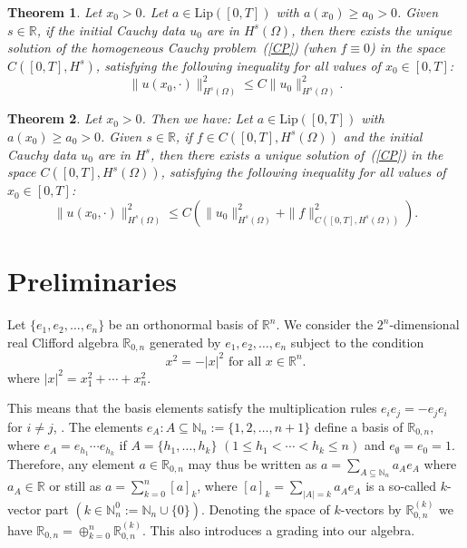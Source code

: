 \documentclass[12pt]{amsart}
\newtheorem{theorem}{Theorem}[section]
\theoremstyle{definition}
\newcommand{\R}{\mathbb{R}}
\newcommand{\N}{\mathbb{N}}
\newcommand{\inci}{\subseteq}
\begin{document}
\begin{theorem}
\label{th1.1}
Let \(x_0 > 0\). Let \(a \in \mathrm{Lip}([0, T])\) with \(a(x_0) \geq a_0 > 0\). Given \(s \in \mathbb{R}\), if the initial Cauchy data \(u_0\) are in \(H^{s}(\Omega)\), then there exists the unique solution of the homogeneous Cauchy problem~(\ref{CP}) (when \(f \equiv 0\)) in the space \(C([0, T], H^{s})\), satisfying the following inequality for all values of \(x_0 \in [0, T]\):
    \begin{equation*}
    \label{eq:1.5}
          \| u(x_0, \cdot) \|_{H^s(\Omega)}^2  \leq C \| u_0 \|_{H^s(\Omega)}^2 .
    \end{equation*}
\end{theorem}

\begin{theorem}
\label{th1.2}
Let \(x_0 > 0\). Then we have:
Let \(a \in \mathrm{Lip}([0, T])\) with \(a(x_0) \geq a_0 > 0\). Given \(s \in \mathbb{R}\), if \(f \in C([0, T], H^{s}(\Omega))\) and the initial Cauchy data \(u_0\) are in \(H^s\), then there exists a unique solution of~(\ref{CP}) in the space \(C([0, T], H^s(\Omega))\), satisfying the following inequality for all values of \(x_0 \in [0, T]\):
    \begin{equation}
    \label{eq:1.6}
    \| u(x_0, \cdot) \|_{H^s(\Omega)}^2  \leq C\left(\| u_0 \|_{H^s(\Omega)}^2+\| f\|_{C([0, T], H^{s}(\Omega))}^2\right).
   \end{equation}
\end{theorem}

\section{Preliminaries}

Let $\{e_1,e_2,\ldots,e_n\}$ be an orthonormal basis of $\R^n$. We consider the $2^n$-dimensional real Clifford algebra $\R_{0,n}$ generated by $e_1,e_2,\ldots,e_n$ subject to the condition 
$$
x^2=-|x|^2 \mbox{ for all } x\in\mathbb{R}^n.
$$
where $|x|^2=x_1^2+\cdots +x_n^2$. 

This means that the basis elements satisfy the multiplication rules $e_ie_j=-e_je_i$ for $i\neq j$, . The elements $e_A : A\subseteq \N_n:=\{1,2,\ldots, n+1\}$ define a basis of $\R_{0,n}$, where $e_A=e_{h_1}\cdots e_{h_k}$ if $A=\{h_1, \ldots,h_k\}$ $(1\leq h_1<\cdots<h_k\leq n)$ and $e_\emptyset=e_0=1$. Therefore, any element $a\in\R_{0,n}$ may thus be written as $a=\sum_{A\inci\N_n}a_Ae_A$ where $a_A\in\R$ or still as $a=\sum_{k=0}^n[a]_k$, where {$[a]_k=\sum_{|A|=k}a_A e_A$} is a so-called $k$-vector part $(k\in\N_n^0:=\N_n\cup\{0\})$. Denoting the space of $k$-vectors by $\R_{0,n}^{(k)}$ we have $\R_{0,n}=\oplus_{k=0}^n\R_{0,n}^{(k)}$. This also introduces a grading into our algebra.
\end{document}
